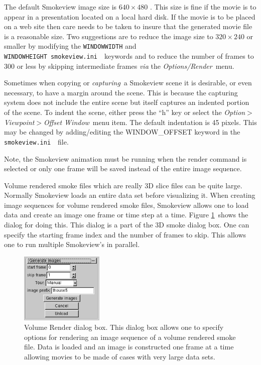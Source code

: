 \documentclass[11pt,twoside]{book}
\newcommand{\svini}{{\tt smokeview.ini}\ }
\begin{document}
The default Smokeview image size is $640\times 480$ .  This size
is fine if the movie is to appear in a presentation located on a
local hard disk.  If the movie is to be placed on a web site then
care needs to be taken to insure that the generated movie file is
a reasonable size.  Two suggestions are to reduce the image size
to $320\times 240$ or smaller by modifying the {\tt WINDOWWIDTH}
and {\tt WINDOWHEIGHT}\ \svini\ keywords  and to reduce the number
of frames to 300 or less by skipping intermediate frames {\em via}
the {\em Options/Render}\ menu.

Sometimes when copying or {\em capturing}\ a Smokeview scene it is
desirable, or even necessary, to have a margin around the scene.
This is because the capturing system does not include the entire
scene but itself captures an indented portion of the scene. To
indent the scene, either press the ``h'' key or select the {\em
Option$>$Viewpoint$>$Offset Window}\ menu item. The default
indentation is 45 pixels. This may be changed by adding/editing
the WINDOW\_OFFSET keyword in the \svini\ file.

Note, the Smokeview animation must be running when the render command is
selected or only one frame will be saved instead of the entire image sequence.

Volume rendered smoke files which are really 3D slice files can be quite large.
Normally Smokeview loads an entire data set before visualizing it.
When creating image sequences for volume rendered smoke files,
Smokeview allows one to load data and create an image one frame or time step at a time.
Figure \ref{figVOLRENDER}\ shows the dialog for doing this.  This dialog
is a part of the 3D smoke dialog box. One can specify the starting frame index
and the number of frames to skip.  This allows one to run multiple Smokeview's in
parallel.

\begin{figure}[bph]
\centerline{
\includegraphics[width=1.5625in]{FIGURES/figVOLRENDER}
}
\caption[Volume Render dialog box.]{Volume Render dialog box.
This dialog box allows one to specify
options for rendering an image sequence of a volume rendered smoke file. Data is loaded
and an image is constructed one frame at a time allowing movies to be made of cases
with very large data sets.
}
\label{figVOLRENDER}
\end{figure}
\end{document}
